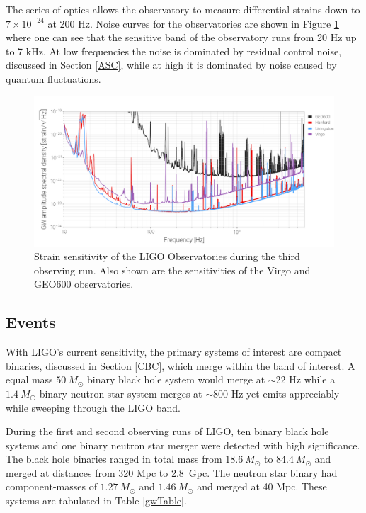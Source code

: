\documentclass [12pt, proquest]{uwthesis}[2019]
\begin{document}
The series of optics allows the observatory to measure differential strains down to $7\times10^{-24}$ at 200 Hz.  Noise curves for the observatories are shown in Figure \ref{LIGO_Strain} where one can see that the sensitive band of the observatory runs from 20 Hz up to 7 kHz. At low frequencies the noise is dominated by residual control noise, discussed in Section \ref{ASC}, while at high it is dominated by noise caused by quantum fluctuations.  \cite{Squeeze}

\begin{figure}[!h]
\begin{center}
\includegraphics[width=\textwidth]{LIGOSens.png}
\caption[Strain sensitivity of the LIGO and Virgo Observatories]{Strain sensitivity of the LIGO Observatories during the third observing run. Also shown are the sensitivities of the Virgo and GEO600 observatories. \cite{LIGOopen}}
\label{LIGO_Strain}
\end{center}
\end{figure}


\subsection{Events}

With LIGO's current sensitivity, the primary systems of interest are compact binaries, discussed in Section \ref{CBC}, which merge within the band of interest. A equal mass $50\ M_\odot$ binary black hole system would merge at $\sim$22 Hz while a $1.4\ M_\odot$ binary neutron star system merges at $\sim$800 Hz yet emits appreciably while sweeping through the LIGO band.

During the first and second observing runs of LIGO, ten binary black hole systems and one binary neutron star merger were detected with high significance. \cite{GWTC} The black hole binaries ranged in total mass from $18.6\ M_\odot$ to $84.4\ M_\odot$ and merged at distances from 320 Mpc to 2.8~Gpc. The neutron star binary had component-masses of $1.27\ M_\odot$ and $1.46\ M_\odot$ and merged at 40 Mpc. These systems are tabulated in Table \ref{gwTable}.
\end{document}
